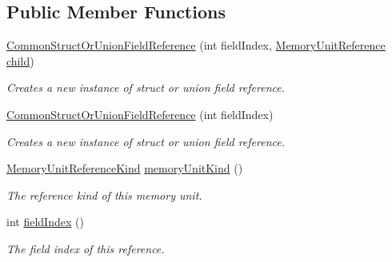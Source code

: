 \subsection*{Public Member Functions}
\begin{DoxyCompactItemize}
\item 
\hyperlink{classedu_1_1udel_1_1cis_1_1vsl_1_1civl_1_1model_1_1common_1_1expression_1_1reference_1_1CommonStructOrUnionFieldReference_a91e98082f9b17be50b5c7c555c1e92d5}{Common\+Struct\+Or\+Union\+Field\+Reference} (int field\+Index, \hyperlink{interfaceedu_1_1udel_1_1cis_1_1vsl_1_1civl_1_1model_1_1IF_1_1expression_1_1reference_1_1MemoryUnitReference}{Memory\+Unit\+Reference} \hyperlink{classedu_1_1udel_1_1cis_1_1vsl_1_1civl_1_1model_1_1common_1_1expression_1_1reference_1_1CommonReference_a32b580fa84654a7581644054dd9a7fa7}{child})
\begin{DoxyCompactList}\small\item\em Creates a new instance of struct or union field reference. \end{DoxyCompactList}\item 
\hyperlink{classedu_1_1udel_1_1cis_1_1vsl_1_1civl_1_1model_1_1common_1_1expression_1_1reference_1_1CommonStructOrUnionFieldReference_aa6e558f15875c19163b4cdaae28a7c16}{Common\+Struct\+Or\+Union\+Field\+Reference} (int field\+Index)
\begin{DoxyCompactList}\small\item\em Creates a new instance of struct or union field reference. \end{DoxyCompactList}\item 
\hyperlink{enumedu_1_1udel_1_1cis_1_1vsl_1_1civl_1_1model_1_1IF_1_1expression_1_1reference_1_1MemoryUnitRef64a306b012808a0db442488810ff9534}{Memory\+Unit\+Reference\+Kind} \hyperlink{classedu_1_1udel_1_1cis_1_1vsl_1_1civl_1_1model_1_1common_1_1expression_1_1reference_1_1CommonStructOrUnionFieldReference_a2403f58a1e80b39176a963b96bd935f1}{memory\+Unit\+Kind} ()
\begin{DoxyCompactList}\small\item\em The reference kind of this memory unit. \end{DoxyCompactList}\item 
int \hyperlink{classedu_1_1udel_1_1cis_1_1vsl_1_1civl_1_1model_1_1common_1_1expression_1_1reference_1_1CommonStructOrUnionFieldReference_aa5a40daf419de92aba8e24f31816103c}{field\+Index} ()
\begin{DoxyCompactList}\small\item\em The field index of this reference. \end{DoxyCompactList}\end{DoxyCompactItemize}
